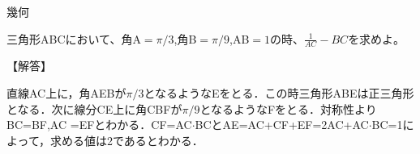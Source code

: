 \documentclass[a4paper,fleqn,dvipdfmx]{jsarticle}
\begin{document}
\newpage


\begin{itembox}[l]{幾何}

    三角形ABCにおいて、角A$=\pi/3$,角B$=\pi/9$,AB$=1$の時、$\frac{1}{AC}-BC$を求めよ。
    
\end{itembox}


\begin{flushleft}
【解答】
\end{flushleft}

    直線AC上に，角AEBが$\pi/3$となるようなEをとる．この時三角形ABEは正三角形となる．次に線分CE上に角CBFが$\pi/9$となるようなFをとる．対称性よりBC=BF,AC =EFとわかる．CF=AC$\cdot$BCとAE=AC+CF+EF=2AC+AC$\cdot$BC=1によって，求める値は2であるとわかる．
\end{document}
